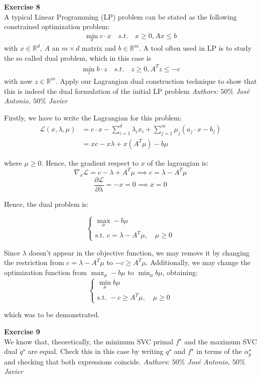 \documentclass[11pt,table]{article}
\newenvironment{problem}[2][Exercise]
{ \begin{mdframed}[backgroundcolor=gray!20] \textbf{#1 #2} \\}
	{\hspace{0.0cm}\newline\newline \emph{Authors: \(50\%\) José Antonio, \(50\%\) Javier}  \end{mdframed}}
\newcommand\R{\mathbb R}
\begin{document}
\begin{problem}{8}
A typical Linear Programming (LP) problem can be stated as the following constrained optimization problem:
\begin{align*}
	\min_x c \cdot x \quad s.t. \quad x \geq 0, Ax \leq b
\end{align*}
with \(x \in \R^d\), \(A\) an \(m \times d\) matrix and \(b \in \R^m\). A tool often used in LP is to study the so called dual problem, which in this case is
\begin{align*}
	\min_{z} b \cdot z \quad s.t. \quad z \geq 0, A^T z \leq -c
\end{align*}
with now \(z \in \R^m\). Apply our Lagrangian dual construction technique to show that this is indeed the dual formulation of the initial LP problem
\end{problem}

Firstly, we have to write the Lagrangian for this problem:
\begin{align*}
	\mathcal L(x,\lambda,\mu) & = c \cdot x -  \sum_{i=1}^d \lambda_i x_i  + \sum_{j=1}^m \mu_j(a_j \cdot x - b_j) \\
	                          & = xc - x\lambda + x\left(A^T \mu\right) - b\mu
\end{align*}

where $\mu \ge 0$. Hence, the gradient respect to \(x\) of the lagrangian is:
\[
	\nabla_x \mathcal L = c - \lambda + A^T \mu \implies c = \lambda - A^T\mu
\]
\[
	\frac{\partial \mathcal L}{\partial \lambda} = -x = 0 \implies x = 0
\]

Hence, the dual problem is:

\[
	\begin{cases}
		\max_\mu - b \mu \\
		\text{s.t. } c = \lambda - A^T\mu, \quad \mu \ge 0
	\end{cases}
\]

Since $\lambda$ doesn't appear in the objective function, we may remove it by changing the restriction from $c = \lambda - A^T\mu$ to $-c \geq A^T\mu$. Additionally, we may change the optimization function from $\max_\mu - b \mu$ to $\min_\mu b \mu$, obtaining:
\[
	\begin{cases}
		\min_\mu b \mu \\
		\text{s.t. } -c \ge A^T\mu, \quad \mu \ge 0
	\end{cases}
\]

which was to be demonstrated. \\

\begin{problem}{9}
We know that, theoretically, the minimum SVC primal \(f^\star\) and the maximum SVC dual \(q^\star\) are equal. Check this in this case by writing \(q^\star\) and \(f^\star\) in terms of the \(\alpha_p^\star\) and checking that both expressions coincide.
\end{problem}
\end{document}
